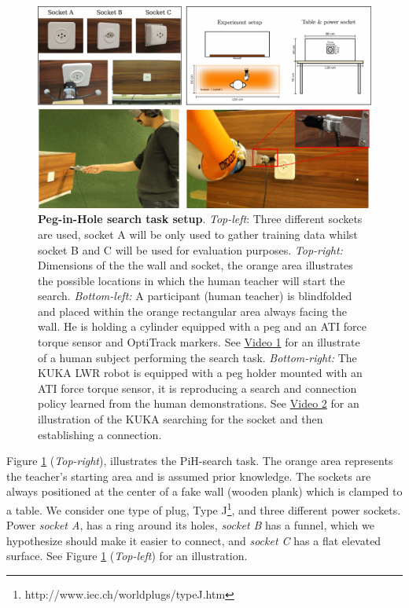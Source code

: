 \documentclass[final,5p,times,twocolumn]{elsarticle}
\begin{document}
\begin{figure}
 \centering
 \includegraphics[width=0.85\linewidth]{./Figure/Figure1.pdf}
 \caption{\textbf{Peg-in-Hole search task setup}.
  \textit{Top-left}: Three different sockets are used, socket A will be only used to gather training data whilst socket B and 
  C will be used for evaluation purposes.  \textit{Top-right:} Dimensions of the the wall and socket, the orange area illustrates the possible locations 
  in which the human teacher will start the search.
  \textit{Bottom-left:} A participant (human teacher) is blindfolded and  placed within the orange rectangular area always 
  facing the wall. He is holding a cylinder equipped with a peg and an  ATI force torque sensor and OptiTrack markers. See \href{http://lasa.epfl.ch/videos/gpldecha/pih-search/human_search.wmv}{Video 1} for 
  an illustrate of a human subject performing the search task.
  \textit{Bottom-right:} The KUKA LWR robot is equipped with a peg holder mounted with an ATI force torque sensor, it is reproducing a search 
  and connection policy learned from the human demonstrations. See \href{http://lasa.epfl.ch/videos/gpldecha/pih-search/KUKA_pih-search.wmv}{Video 2} for an illustration of the KUKA searching for the socket and then 
  establishing a connection.}
    \label{fig:search_task_setup}
\end{figure}

Figure \ref{fig:search_task_setup} (\textit{Top-right}), illustrates the PiH-search task. The orange area represents 
the teacher's starting area and is assumed prior knowledge. The sockets are always positioned at the center of a fake 
wall (wooden plank) which is clamped to a table. We consider one type of plug, 
Type J\footnote{http://www.iec.ch/worldplugs/typeJ.htm}, and three different power sockets. 
Power \textit{socket A}, has a ring around its holes, \textit{socket B} has a funnel, which we hypothesize should make 
it easier to connect, and \textit{socket C} has a flat elevated surface. See Figure \ref{fig:search_task_setup}
(\textit{Top-left}) for an illustration. 
\end{document}

